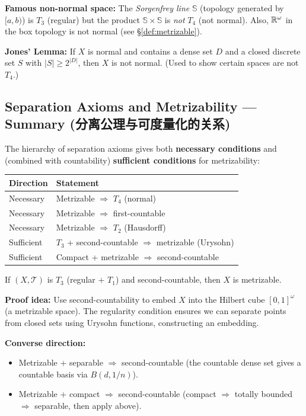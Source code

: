 \documentclass{article}
\begin{document}
\textbf{Famous non-normal space:} The \emph{Sorgenfrey line}
$\mathbb{S}$ (topology generated by $[a, b)$) is $T_3$ (regular) but
the product $\mathbb{S} \times \mathbb{S}$ is \emph{not} $T_4$ (not normal).
Also, $\mathbb{R}^\omega$ in the box topology is not normal
(see \S\ref{def:metrizable}).

\textbf{Jones' Lemma:} If $X$ is normal and contains a dense set $D$ and
a closed discrete set $S$ with $|S| \ge 2^{|D|}$, then $X$ is not normal.
(Used to show certain spaces are not $T_4$.)

\subsection{Separation Axioms and Metrizability --- Summary
(分离公理与可度量化的关系)}\label{def:sep-metrizable}

The hierarchy of separation axioms gives both \textbf{necessary conditions}
and (combined with countability) \textbf{sufficient conditions} for
metrizability:

\begin{center}
  \begin{tabular}{ll}
    \textbf{Direction} & \textbf{Statement} \\
    \hline
    Necessary & Metrizable $\Rightarrow$ $T_4$ (normal) \\
    Necessary & Metrizable $\Rightarrow$ first-countable \\
    Necessary & Metrizable $\Rightarrow$ $T_2$ (Hausdorff) \\
    \hline
    Sufficient & $T_3$ + second-countable $\Rightarrow$ metrizable (Urysohn) \\
    Sufficient & Compact + metrizable $\Rightarrow$ second-countable \\
  \end{tabular}
\end{center}

\begin{theorem}
  \label{thm:urysohn-metrization}
  If $(X, \mathcal{T})$ is $T_3$ (regular $+$ $T_1$) and second-countable,
  then $X$ is metrizable.
\end{theorem}

\textbf{Proof idea:} Use second-countability to embed $X$ into
the Hilbert cube $[0,1]^\omega$ (a metrizable space). The regularity
condition ensures we can separate points from closed sets using
Urysohn functions, constructing an embedding.

\textbf{Converse direction:}
\begin{itemize}
  \item Metrizable + separable $\Rightarrow$ second-countable
    (the countable dense set gives a countable basis via $B(d, 1/n)$).
  \item Metrizable + compact $\Rightarrow$ second-countable
    (compact $\Rightarrow$ totally bounded $\Rightarrow$ separable,
    then apply above).
\end{itemize}
\end{document}
